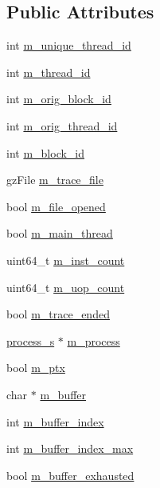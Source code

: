 \subsection*{Public Attributes}
\begin{DoxyCompactItemize}
\item 
int \hyperlink{structthread__s_a3fabe97150e2faf6bcdc10e50d6aceee}{m\_\-unique\_\-thread\_\-id}
\item 
int \hyperlink{structthread__s_a04bae5c54623a9040e2c8bb136d27470}{m\_\-thread\_\-id}
\item 
int \hyperlink{structthread__s_af58128f3c139ab946d96c1b453c0708a}{m\_\-orig\_\-block\_\-id}
\item 
int \hyperlink{structthread__s_a7557fcd4c6c92363d3345c65dc3a4603}{m\_\-orig\_\-thread\_\-id}
\item 
int \hyperlink{structthread__s_ab3c9083e089fff4f6b97d39ed0ba4b51}{m\_\-block\_\-id}
\item 
gzFile \hyperlink{structthread__s_a96bd9cfd9a5e605f4eee72f92ca9f513}{m\_\-trace\_\-file}
\item 
bool \hyperlink{structthread__s_a0cf104a3dce7ddb37a48cf8b713b4ac2}{m\_\-file\_\-opened}
\item 
bool \hyperlink{structthread__s_a01a8c95c8e26b8ac986370337d4e15b3}{m\_\-main\_\-thread}
\item 
uint64\_\-t \hyperlink{structthread__s_ac29afed70ffd879732e441851c08380f}{m\_\-inst\_\-count}
\item 
uint64\_\-t \hyperlink{structthread__s_ab3eae22c15000ab6e61395cb0c56fa20}{m\_\-uop\_\-count}
\item 
bool \hyperlink{structthread__s_a02fca6a746d6446fce1b5f2c8adf9366}{m\_\-trace\_\-ended}
\item 
\hyperlink{structprocess__s}{process\_\-s} $\ast$ \hyperlink{structthread__s_ab3d94c455b77f0cc2f14151f8574c153}{m\_\-process}
\item 
bool \hyperlink{structthread__s_a12ca032501e4c819e864f4118781aa66}{m\_\-ptx}
\item 
char $\ast$ \hyperlink{structthread__s_a454df2fcda350ce8d6fde3ad01dddfcf}{m\_\-buffer}
\item 
int \hyperlink{structthread__s_a9aebcb5639f20227246a12fbfd1dbcc9}{m\_\-buffer\_\-index}
\item 
int \hyperlink{structthread__s_a556880e1e2a0ae1fdb174a41bd94bc10}{m\_\-buffer\_\-index\_\-max}
\item 
bool \hyperlink{structthread__s_ac6b1743df3ea0beb279fcccf9a2833df}{m\_\-buffer\_\-exhausted}

\end{DoxyCompactItemize}
